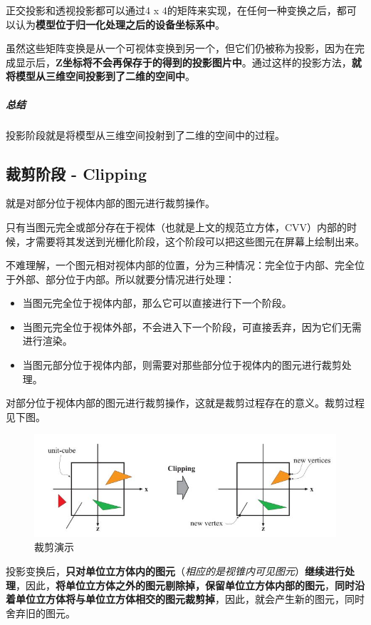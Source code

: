 \documentclass[UTF8,a4paper,12pt]{ctexbook}
\begin{document}
			正交投影和透视投影都可以通过4 x 4的矩阵来实现，在任何一种变换之后，都可以认为\textbf{模型位于归一化处理之后的设备坐标系中}。
			
			虽然这些矩阵变换是从一个可视体变换到另一个，但它们仍被称为投影，因为在完成显示后，\textbf{Z坐标将不会再保存于的得到的投影图片中}。通过这样的投影方法，\textbf{就将模型从三维空间投影到了二维的空间中}。
			
			\subparagraph{总结} 投影阶段就是将模型从三维空间投射到了二维的空间中的过程。
			
		\subsection{裁剪阶段 - Clipping} 
			就是对部分位于视体内部的图元进行裁剪操作。
			
			只有当图元完全或部分存在于视体（也就是上文的规范立方体，CVV）内部的时候，才需要将其发送到光栅化阶段，这个阶段可以把这些图元在屏幕上绘制出来。
			
			不难理解，一个图元相对视体内部的位置，分为三种情况：完全位于内部、完全位于外部、部分位于内部。所以就要分情况进行处理：
				\begin{itemize}
					\item 当图元完全位于视体内部，那么它可以直接进行下一个阶段。
					\item 当图元完全位于视体外部，不会进入下一个阶段，可直接丢弃，因为它们无需进行渲染。
					\item 当图元部分位于视体内部，则需要对那些部分位于视体内的图元进行裁剪处理。				
				\end{itemize}
			
			对部分位于视体内部的图元进行裁剪操作，这就是裁剪过程存在的意义。裁剪过程见下图。
				
				\begin{figure}[H]
					\centering
					\includegraphics[scale=0.57]{clip}
					\caption{裁剪演示}
				\end{figure}
			
			投影变换后，\textbf{只对单位立方体内的图元}（\textit{相应的是视锥内可见图元}）\textbf{继续进行处理}，因此，\textbf{将单位立方体之外的图元剔除掉，保留单位立方体内部的图元}，\textbf{同时沿着单位立方体将与单位立方体相交的图元裁剪掉}，因此，就会产生新的图元，同时舍弃旧的图元。
			
\end{document}
